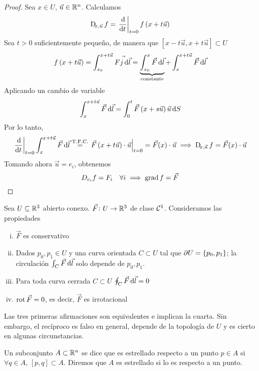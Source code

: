 \begin{proof}
    Sea $x \in U$, $\vec{u} \in \mathbb{R}^n$. Calculamos
    \[
        \Dif_{x, \vec{u}} f = \left. \dv{}{t} \right\vert_{t = 0} f\left( x + t \vec{u} \right)
    \]
    Sea $t > 0$ suficientemente pequeño, de manera que $\left[ x - t \vec{u}, x + t\vec{u}\right] \subset U$
    \begin{gather*}
        f \left( x + t \vec{u} \right) = \int^{x+ t \vec{u}}_{x_0} \vec{Fj \dif \vec{l}} = \underbrace{\int^x_{x_0} \vec{F} \dif \vec{l}}_{\text{constante}}
        + \int^{x + t \vec{u}}_x \vec{F} \dif \vec{l}
    \end{gather*}
    Aplicando un cambio de variable
    \[
        \int^{x + t \vec{u}}_{x} \vec{F} \dif \vec{l} = \int^t_0 \vec{F} \left( x + s \vec{u} \right) \vec{u} \dif S
    \]
    Por lo tanto,
    \[
        \left. \dv{}{t} \right\vert_{t=0} \int^{x + t \vec{u}}_x \vec{F} \dif \vec{l} \stackrel{\text{T.F.C.}}{=}
        \left. \vec{F}\left( x + t \vec{u} \right) \cdot \vec{u} \right\vert_{t=0} = \vec{F}(x) \cdot \vec{u} \implies
        \Dif_{x, \vec{u} }f = \vec{F}(x) \cdot \vec{u}
    \]
    Tomando ahora $\vec{u} = e_i$, obtenemos
    \[
        D_{e_i} f = F_i \quad \forall i \implies \operatorname{grad} f = \vec{F}
    \]
\end{proof}

\begin{teo*}
    Sea $U \subseteq \mathbb{R}^3$ abierto conexo. $\vec{F} \colon U \to \mathbb{R}^3$ de clase $\mathcal{C}^1$. Consideramos las propiedades
    \begin{enumerate}[(i)]
        \item $\vec{F}$ es conservativo
        \item Dados $p_0, p_1 \in U$ y una curva orientada $C \subset U$ tal que $\partial U = \left\{p_0, p_1\right\}$; la circulación
            $\int_C \vec{F} \dif \vec{l}$ solo depende de $p_0, p_1$.
        \item Para toda curva cerrada $C \subset U$ $\oint_C \vec{F} \dif \vec{l} = 0$
        \item $\operatorname{rot} \vec{F} = 0$, es decir, $\vec{F}$ es irrotacional
    \end{enumerate}

    Las tres primeras afirmaciones son equivalentes e implican la cuarta. Sin embargo, el recíproco es falso en general,
    depende de la topología de $U$ y es cierto en algunas circunstancias. 
\end{teo*}

\begin{defi}
    Un subconjunto $A \subset \mathbb{R}^n$ se dice que es estrellado respecto a un punto $p \in A$  si $\forall q \in A$,
    $[p, q] \subset A$. Diremos que $A$ es estrellado si lo es respecto a un punto.
\end{defi}

